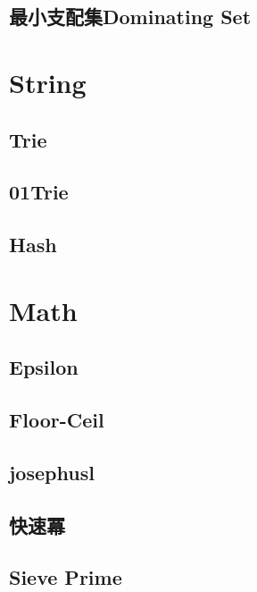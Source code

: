 \subsection{最小支配集Dominating Set}


\section{String}

\subsection{Trie}


\subsection{01Trie}


\subsection{Hash}


\section{Math}

\subsection{Epsilon}


\subsection{Floor-Ceil}


\subsection{josephusl}


\subsection{快速冪}


\subsection{Sieve Prime}


